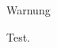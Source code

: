 \documentclass[t,ngerman]{beamer}
\begin{document}
\begin{alertblock}{Warnung}

Test.
\end{alertblock}
\end{document}
